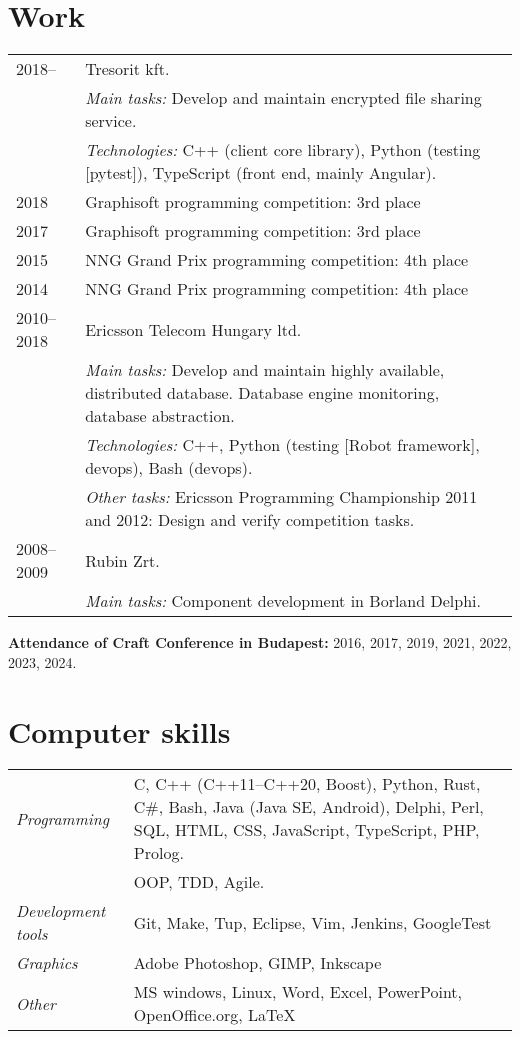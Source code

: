 \documentclass[a4paper,10pt]{article}
\newcommand{\pont}[1]{\emph{#1}}
\begin{document}
\section*{Work}
\begin{tabular}{lp{10cm}}
 2018--&Tresorit kft.\\
  &\emph{Main tasks:} Develop and maintain encrypted file sharing service.\\
  &\emph{Technologies:} C++ (client core library), Python (testing [pytest]), TypeScript (front end, mainly Angular).\\
 2018&Graphisoft programming competition: 3rd place\\
 2017&Graphisoft programming competition: 3rd place\\
 2015&NNG Grand Prix programming competition: 4th place\\
 2014&NNG Grand Prix programming competition: 4th place\\
 2010--2018&Ericsson Telecom Hungary ltd.\\
  &\emph{Main tasks:} Develop and maintain highly available, distributed database. Database engine monitoring, database abstraction.\\
  &\emph{Technologies:} C++, Python (testing [Robot framework], devops), Bash (devops).\\
  &\emph{Other tasks:} Ericsson Programming Championship 2011 and 2012: Design and verify competition tasks.\\
 2008--2009&Rubin Zrt.\\
  &\emph{Main tasks:} Component development in Borland Delphi.
\end{tabular}

\textbf{Attendance of Craft Conference in Budapest:} 2016, 2017, 2019, 2021, 2022, 2023, 2024.

\section*{Computer skills}
\begin{tabular}{lp{12cm}}
    \pont{Programming}&C, C++ (C++11--C++20, Boost), Python, Rust, C#, Bash, Java (Java SE, Android), Delphi, Perl, SQL, HTML, CSS, JavaScript, TypeScript, PHP, Prolog.\\
 &OOP, TDD, Agile.\\
 \pont{Development tools}&Git, Make, Tup, Eclipse, Vim, Jenkins, GoogleTest\\
 \pont{Graphics}&Adobe Photoshop, GIMP, Inkscape\\
 \pont{Other}&MS windows, Linux, Word, Excel, PowerPoint, OpenOffice.org, LaTeX
\end{tabular}
\end{document}
